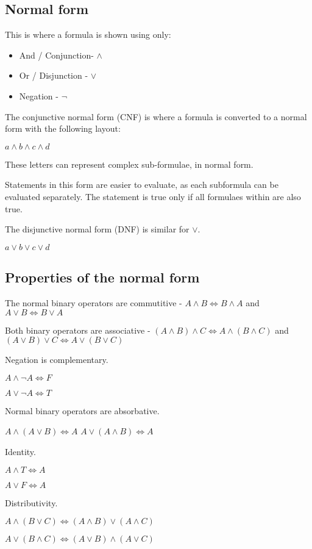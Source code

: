 \subsection{Normal form}

This is where a formula is shown using only:	

\begin{itemize}
\item And / Conjunction- \(\land \)
\item Or / Disjunction   - \(\lor \)
\item Negation - \(\neg \)
\end{itemize}

The conjunctive normal form (CNF) is where a formula is converted to a normal form with the following layout:

$a \land b \land c \land d$

These letters can represent complex sub-formulae, in normal form.

Statements in this form are easier to evaluate, as each subformula can be evaluated separately. The statement is true only if all formulaes within are also true.

The disjunctive normal form (DNF) is similar for \(\lor \).

$a \lor b \lor c \lor d$

\subsection{Properties of the normal form}

The normal binary operators are commutitive - \(A\land B\Leftrightarrow B\land A\) and \(A\lor B\Leftrightarrow B\lor A\)

Both binary operators are associative - \((A\land B)\land C\Leftrightarrow A\land (B\land C)\) and \((A\lor B)\lor C\Leftrightarrow A\lor (B\lor C)\)

Negation is complementary.

\(A\land \neg A\Leftrightarrow F \)

\(A\lor \neg A\Leftrightarrow T\)

Normal binary operators are absorbative.

\(A\land (A\lor B)\Leftrightarrow A\)
\(A\lor (A\land B)\Leftrightarrow A\)

Identity.

\(A\land T\Leftrightarrow A\)

\(A\lor F \Leftrightarrow A\)

Distributivity.

\(A\land (B\lor C)\Leftrightarrow (A\land B)\lor (A\land C)\)

\(A\lor (B\land C)\Leftrightarrow (A\lor B)\land(A\lor C)\)		


